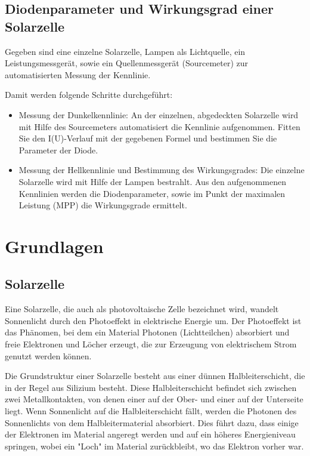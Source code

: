 \documentclass[12pt,english,ngerman]{scrartcl}
\begin{document}
\subsection{Diodenparameter und Wirkungsgrad einer Solarzelle}

Gegeben sind eine einzelne Solarzelle, Lampen als Lichtquelle, ein
Leistungsmessgerät, sowie ein Quellenmessgerät (Sourcemeter) zur
automatisierten Messung der Kennlinie.

Damit werden folgende Schritte durchgeführt:

\begin{itemize}
	\item Messung der Dunkelkennlinie: An der einzelnen, abgedeckten Solarzelle wird mit
	      Hilfe des Sourcemeters automatisiert die Kennlinie aufgenommen. Fitten Sie den
	      I(U)-Verlauf mit der gegebenen Formel und bestimmen Sie die Parameter der
	      Diode.
	\item Messung der Hellkennlinie und Bestimmung des Wirkungsgrades: Die einzelne
	      Solarzelle wird mit Hilfe der Lampen bestrahlt. Aus den aufgenommenen
	      Kennlinien werden die Diodenparameter, sowie im Punkt der maximalen Leistung
	      (MPP) die Wirkungsgrade ermittelt.
\end{itemize}

\section{Grundlagen}\label{Grund}

\subsection{Solarzelle}
Eine Solarzelle, die auch als photovoltaische Zelle bezeichnet wird, wandelt
Sonnenlicht durch den Photoeffekt in elektrische Energie um. Der Photoeffekt
ist das Phänomen, bei dem ein Material Photonen (Lichtteilchen) absorbiert und
freie Elektronen und Löcher erzeugt, die zur Erzeugung von elektrischem Strom
genutzt werden können.

Die Grundstruktur einer Solarzelle besteht aus einer dünnen Halbleiterschicht,
die in der Regel aus Silizium besteht. Diese Halbleiterschicht befindet sich
zwischen zwei Metallkontakten, von denen einer auf der Ober- und einer auf der
Unterseite liegt. Wenn Sonnenlicht auf die Halbleiterschicht fällt, werden die
Photonen des Sonnenlichts von dem Halbleitermaterial absorbiert. Dies führt
dazu, dass einige der Elektronen im Material angeregt werden und auf ein
höheres Energieniveau springen, wobei ein "Loch" im Material zurückbleibt, wo
das Elektron vorher war.
\end{document}
